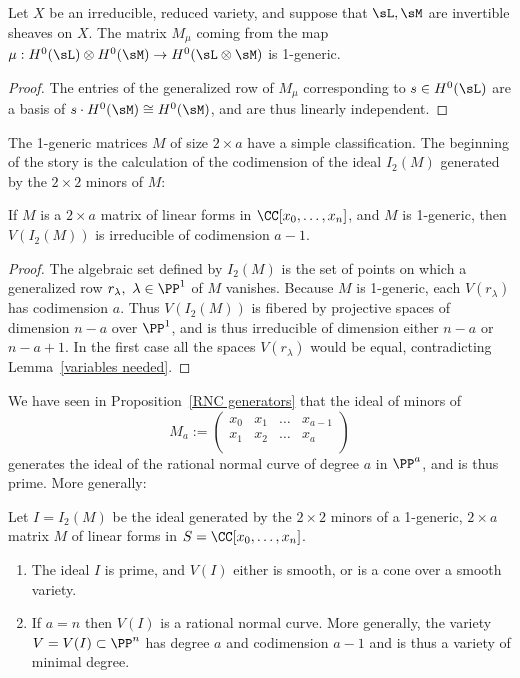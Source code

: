 \begin{proposition}\label{some generators}
Let $X$ be
an irreducible, reduced variety, and suppose that $\sL,\sM$ are invertible sheaves on $X$.
The matrix $M_\mu$ coming from the map $\mu:H^0(\sL) \otimes H^0(\sM) \to H^0(\sL\otimes \sM)$
is 1-generic.
\end{proposition}

\begin{proof} The entries of the generalized row of $M_\mu$ corresponding to $s\in H^0(\sL)$
are a basis of $s\cdot H^0(\sM) \cong H^0(\sM)$, and are thus
linearly independent.
\end{proof}

The 1-generic matrices $M$ of size $2\times a$ have a simple classification. The beginning of the story is the
 calculation of the codimension of the ideal $I_2(M)$ generated by the $2\times 2$ minors of $M$:

\begin{lemma}\label{codim of 2,n 1-generic}
If $M$ is a $2\times a$ matrix of linear forms in $\CC[x_0,\dots, x_n]$, and $M$ is 1-generic, then 
  $V(I_2(M))$ is irreducible of codimension $a-1$.
\end{lemma}

\begin{proof}
The algebraic set defined by $I_2(M)$ is the set of points on which a generalized row $r_\lambda, \ \lambda\in \PP^1$ of $M$ vanishes.
Because $M$ is 1-generic, each $V(r_\lambda)$ has codimension $a$. Thus $V(I_2(M))$ is fibered by projective
spaces of dimension $n-a$ over $\PP^1$, and is thus irreducible of dimension either $n-a$ or $n-a+1$. In the first
case all the spaces $V(r_\lambda)$  would be equal, contradicting Lemma~\ref{variables needed}.
\end{proof}


We have seen in Proposition~\ref{RNC generators} that the ideal of minors of
$$
M_{a}:= 
\begin{pmatrix}
 x_0&x_1&\dots&x_{a-1}\\
 x_1&x_2&\dots&x_{a}\\
\end{pmatrix}
$$ 
generates the ideal of the rational normal curve of degree $a$ in $\PP^a$, and is thus prime. More generally:

\begin{theorem}\label{1-generic basics}  
Let $I = I_2(M)$  be the ideal generated by the $2\times 2$ minors of  a 1-generic, $2\times a$ matrix $M$
of linear forms in $S = \CC[x_0,\dots, x_n]$.
 \begin{enumerate}

\item The ideal $I$ is prime, and $V(I)$ either is smooth, or is a cone over a smooth variety.

\item If $a=n$ then $V(I)$ is a rational normal curve. More generally, the variety $V = V(I) \subset \PP^n$ has degree $a$ and codimension $a-1$ and is thus a variety of minimal degree.
\end{enumerate}
\end{theorem}


